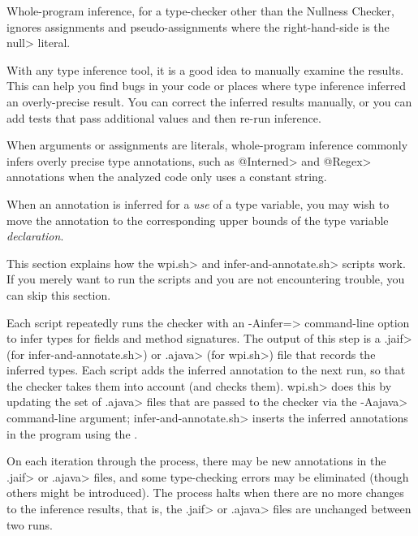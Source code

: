Whole-program inference, for a type-checker other than the Nullness Checker,
ignores assignments and pseudo-assignments where the right-hand-side is the \<null> literal.



With any type inference tool, it is a good idea to manually examine the
results.  This can help you find bugs in your code or places where type
inference inferred an overly-precise result.
You can correct the inferred results manually, or you can
add tests that pass additional values and then re-run inference.

When arguments or assignments are literals, whole-program inference
commonly infers overly precise type annotations, such as \<@Interned> and
\<@Regex> annotations when the analyzed code only uses a constant string.

When an annotation is inferred for a \emph{use} of a type variable,
you may wish to move the annotation
to the corresponding upper bounds of the type variable \emph{declaration}.



This section explains how the \<wpi.sh> and \<infer-and-annotate.sh> scripts work.  If you
merely want to run the scripts and you are not encountering trouble, you can
skip this section.

Each script repeatedly runs the checker with an \<-Ainfer=> command-line option to infer
types for fields and method signatures.  The output of this step
is a \<.jaif> (for \<infer-and-annotate.sh>) or \<.ajava> (for \<wpi.sh>) file that records the inferred types.
Each script adds the inferred annotation to the next run, so that the checker takes them into
account (and checks them). \<wpi.sh> does this by updating the set of \<.ajava> files that are passed
to the checker via the \<-Aajava> command-line argument;
\<infer-and-annotate.sh> inserts the inferred annotations in the program using the
.

On each
iteration through the process, there may be new annotations in the \<.jaif> or \<.ajava>
files, and some type-checking errors may be eliminated (though others might
be introduced).
The process halts when there are no more changes to the inference results,
that is, the \<.jaif> or \<.ajava> files are unchanged between two runs.

